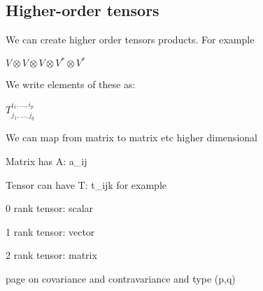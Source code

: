 
\subsection{Higher-order tensors}

We can create higher order tensors products. For example

\(V\otimes V \otimes V\otimes V^* \otimes V^*\)

We write elements of these as:

\(T_{j_1,...,j_q}^{i_1,...,i_p}\)

We can map from matrix to matrix etc higher dimensional

Matrix has A: a_{ij}

Tensor can have T: t_{ijk} for example

0 rank tensor: scalar

1 rank tensor: vector

2 rank tensor: matrix

page on covariance and contravariance and type (p,q)

